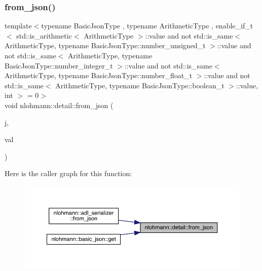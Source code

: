 \subsubsection{\texorpdfstring{from\_json()}{from\_json()}\hspace{0.1cm}{\footnotesize\ttfamily [11/11]}}
{\footnotesize\ttfamily template$<$typename Basic\+Json\+Type , typename Arithmetic\+Type , enable\+\_\+if\+\_\+t$<$ std\+::is\+\_\+arithmetic$<$ Arithmetic\+Type $>$\+::value and not std\+::is\+\_\+same$<$ Arithmetic\+Type, typename Basic\+Json\+Type\+::number\+\_\+unsigned\+\_\+t $>$\+::value and not std\+::is\+\_\+same$<$ Arithmetic\+Type, typename Basic\+Json\+Type\+::number\+\_\+integer\+\_\+t $>$\+::value and not std\+::is\+\_\+same$<$ Arithmetic\+Type, typename Basic\+Json\+Type\+::number\+\_\+float\+\_\+t $>$\+::value and not std\+::is\+\_\+same$<$ Arithmetic\+Type, typename Basic\+Json\+Type\+::boolean\+\_\+t $>$\+::value, int $>$  = 0$>$ \\
void nlohmann\+::detail\+::from\+\_\+json (\begin{DoxyParamCaption}\item[{const Basic\+Json\+Type \&}]{j,  }\item[{Arithmetic\+Type \&}]{val }\end{DoxyParamCaption})}

Here is the caller graph for this function\+:\nopagebreak
\begin{figure}[H]
\begin{center}
\leavevmode
\includegraphics[width=350pt]{namespacenlohmann_1_1detail_a839b0ab50d2c9bce669068f56bc41202_icgraph}
\end{center}
\end{figure}
\mbox{\label{namespacenlohmann_1_1detail_ac53673a5ce29fb69b96d41dad33cb3b0}} 
